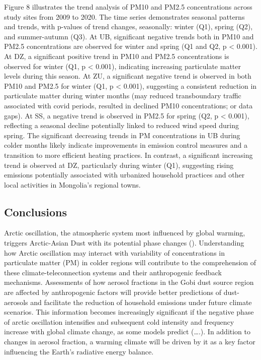 \documentclass[
  11pt,
]{article}
\begin{document}
Figure 8 illustrates the trend analysis of PM10 and PM2.5 concentrations
across study sites from 2009 to 2020. The time series demonstrates
seasonal patterns and trends, with p-values of trend changes,
seasonally: winter (Q1), spring (Q2), and summer-autumn (Q3). At UB,
significant negative trends both in PM10 and PM2.5 concentrations are
observed for winter and spring (Q1 and Q2, p \textless{} 0.001). At DZ,
a significant positive trend in PM10 and PM2.5 concentrations is
observed for winter (Q1, p \textless{} 0.001), indicating increasing
particulate matter levels during this season. At ZU, a significant
negative trend is observed in both PM10 and PM2.5 for winter (Q1, p
\textless{} 0.001), suggesting a consistent reduction in particulate
matter during winter months (may reduced transboundary traffic
associated with covid periods, resulted in declined PM10 concentrations;
or data gaps). At SS, a negative trend is observed in PM2.5 for spring
(Q2, p \textless{} 0.001), reflecting a seasonal decline potentially
linked to reduced wind speed during spring. The significant decreasing
trends in PM concentrations in UB during colder months likely indicate
improvements in emission control measures and a transition to more
efficient heating practices. In contrast, a significant increasing trend
is observed at DZ, particularly during winter (Q1), suggesting rising
emissions potentially associated with urbanized household practices and
other local activities in Mongolia's regional towns.

\subsection{Conclusions}\label{conclusions}

Arctic oscillation, the atmospheric system most influenced by global
warming, triggers Arctic-Asian Dust with its potential phase changes ().
Understanding how Arctic oscillation may interact with variability of
concentrations in particulate matter (PM) in colder regions will
contribute to the comprehension of these climate-teleconnection systems
and their anthropogenic feedback mechanisms. Assessments of how aerosol
fractions in the Gobi dust source region are affected by anthropogenic
factors will provide better predictions of dust-aerosols and facilitate
the reduction of household emissions under future climate scenarios.
This information becomes increasingly significant if the negative phase
of arctic oscillation intensifies and subsequent cold intensity and
frequency increase with global climate change, as some models predict
(\ldots.). In addition to changes in aerosol fraction, a warming climate
will be driven by it as a key factor influencing the Earth's radiative
energy balance.
\end{document}
